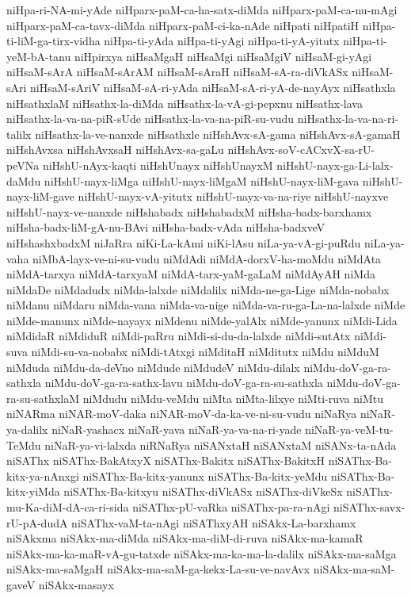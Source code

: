 {niHpa-ri-NA-mi-yAde
niHparx-paM-ca-ha-satx-diMda
niHparx-paM-ca-nu-mAgi
niHparx-paM-ca-tavx-diMda
niHparx-paM-ci-ka-nAde
niHpati
niHpatiH
niHpa-ti-liM-ga-tirx-vidha
niHpa-ti-yAda
niHpa-ti-yAgi
niHpa-ti-yA-yitutx
niHpa-ti-yeM-bA-tanu
niHpirxya
niHsaMgaH
niHsaMgi
niHsaMgiV
niHsaM-gi-yAgi
niHsaM-sArA
niHsaM-sArAM
niHsaM-sAraH
niHsaM-sA-ra-diVkASx
niHsaM-sAri
niHsaM-sAriV
niHsaM-sA-ri-yAda
niHsaM-sA-ri-yA-de-nayAyx
niHsathxla
niHsathxlaM
niHsathx-la-diMda
niHsathx-la-vA-gi-pepxnu
niHsathx-lava
niHsathx-la-va-na-piR-sUde
niHsathx-la-va-na-piR-su-vudu
niHsathx-la-va-na-ri-talilx
niHsathx-la-ve-nanxde
niHsathxle
niHshAvx-sA-gama
niHshAvx-sA-gamaH
niHshAvxsa
niHshAvxsaH
niHshAvx-sa-gaLu
niHshAvx-soV-cACxvX-sa-rU-peVNa
niHshU-nAyx-kaqti
niHshUnayx
niHshUnayxM
niHshU-nayx-ga-Li-lalx-daMdu
niHshU-nayx-liMga
niHshU-nayx-liMgaM
niHshU-nayx-liM-gava
niHshU-nayx-liM-gave
niHshU-nayx-vA-yitutx
niHshU-nayx-va-na-riye
niHshU-nayxve
niHshU-nayx-ve-nanxde
niHshabadx
niHshabadxM
niHsha-badx-barxhamx
niHsha-badx-liM-gA-nu-BAvi
niHsha-badx-vAda
niHsha-badxveV
niHshashxbadxM
niJaRra
niKi-La-kAmi
niKi-lAsu
niLa-ya-vA-gi-puRdu
niLa-ya-vaha
niMbA-layx-ve-ni-su-vudu
niMdAdi
niMdA-dorxV-ha-moMdu
niMdAta
niMdA-tarxya
niMdA-tarxyaM
niMdA-tarx-yaM-gaLaM
niMdAyAH
niMda
niMdaDe
niMdadudx
niMda-lalxde
niMdalilx
niMda-ne-ga-Lige
niMda-nobabx
niMdanu
niMdaru
niMda-vana
niMda-va-nige
niMda-va-ru-ga-La-na-lalxde
niMde
niMde-manunx
niMde-nayayx
niMdenu
niMde-yalAlx
niMde-yanunx
niMdi-Lida
niMdidaR
niMdiduR
niMdi-paRru
niMdi-si-du-da-lalxde
niMdi-sutAtx
niMdi-suva
niMdi-su-va-nobabx
niMdi-tAtxgi
niMditaH
niMditutx
niMdu
niMduM
niMduda
niMdu-da-deVno
niMdude
niMdudeV
niMdu-dilalx
niMdu-doV-ga-ra-sathxla
niMdu-doV-ga-ra-sathx-lavu
niMdu-doV-ga-ra-su-sathxla
niMdu-doV-ga-ra-su-sathxlaM
niMdudu
niMdu-veMdu
niMta
niMta-lilxye
niMti-ruva
niMtu
niNARma
niNAR-moV-daka
niNAR-moV-da-ka-ve-ni-su-vudu
niNaRya
niNaR-ya-dalilx
niNaR-yashacx
niNaR-yava
niNaR-ya-va-na-ri-yade
niNaR-ya-veM-tu-TeMdu
niNaR-ya-vi-lalxda
niRNaRya
niSANxtaH
niSANxtaM
niSANx-ta-nAda
niSAThx
niSAThx-BakAtxyX
niSAThx-Bakitx
niSAThx-BakitxH
niSAThx-Ba-kitx-ya-nAnxgi
niSAThx-Ba-kitx-yanunx
niSAThx-Ba-kitx-yeMdu
niSAThx-Ba-kitx-yiMda
niSAThx-Ba-kitxyu
niSAThx-diVkASx
niSAThx-diVkeSx
niSAThx-mu-Ka-diM-dA-ca-ri-sida
niSAThx-pU-vaRka
niSAThx-pa-ra-nAgi
niSAThx-savx-rU-pA-dudA
niSAThx-vaM-ta-nAgi
niSAThxyAH
niSAkx-La-barxhamx
niSAkxma
niSAkx-ma-diMda
niSAkx-ma-diM-di-ruva
niSAkx-ma-kamaR
niSAkx-ma-ka-maR-vA-gu-tatxde
niSAkx-ma-ka-ma-la-dalilx
niSAkx-ma-saMga
niSAkx-ma-saMgaH
niSAkx-ma-saM-ga-kekx-La-su-ve-navAvx
niSAkx-ma-saM-gaveV
niSAkx-masayx
}
